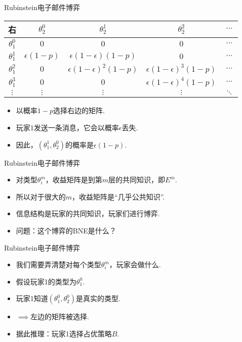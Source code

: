\begin{frame}{Rubinstein电子邮件博弈}
\begin{table}[]
    \centering
\begin{tabular}{c|cccc}
右& $\theta_2^0$ & $\theta_2^1$ & $\theta_2^2$ & $\cdots$ \\
\hline
$\theta_1^0$ & $0$ & $0$ & $0$ & $\cdots$ \\
$\theta_1^1$ & $\epsilon(1 - p)$ & $\epsilon(1 - \epsilon)(1 - p)$ & $0$ & $\cdots$ \\
$\theta_1^2$ & $0$ & $\epsilon(1 - \epsilon)^2(1 - p)$ & $\epsilon(1 - \epsilon)^3(1 - p)$ & $\cdots$ \\
$\theta_1^3$ & $0$ & $0$ & $\epsilon(1 - \epsilon)^4(1 - p)$ & $\cdots$ \\
$\vdots$ & $\vdots$ & $\vdots$ & $\vdots$ & $\ddots$
\end{tabular}
\end{table}
\begin{itemize}
\item 以概率$1 - p$选择右边的矩阵.
\item 玩家1发送一条消息，它会以概率$\epsilon$丢失.
\item 因此，$(\theta_1^1,\theta_2^0)$的概率是$\epsilon(1 - p)$.
\end{itemize}
\end{frame}


\begin{frame}{Rubinstein电子邮件博弈}
\begin{itemize}
\item 对类型$\theta_i^m$，收益矩阵是到第$m$层的共同知识，即$E^m$.
\item 所以对于很大的$m$，收益矩阵是“几乎公共知识”.
\item 信息结构是玩家的共同知识，玩家们进行博弈.
\item 问题：这个博弈的BNE是什么？
\end{itemize}
\end{frame}

\begin{frame}{Rubinstein电子邮件博弈}
\begin{itemize}
\item 我们需要弄清楚对每个类型$\theta_i^m$，玩家会做什么.
\item 假设玩家1的类型为$\theta_1^0$.
\item 玩家1知道$(\theta_1^0,\theta_2^0)$是真实的类型.
\item$\implies$左边的矩阵被选择.
\item 据此推理：玩家1选择占优策略$B$.
\end{itemize}
\end{frame}

